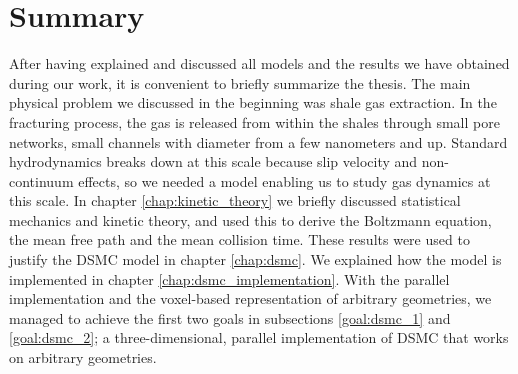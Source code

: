 \section{Summary}
After having explained and discussed all models and the results we have obtained during our work, it is convenient to briefly summarize the thesis. The main physical problem we discussed in the beginning was shale gas extraction. In the fracturing process, the gas is released from within the shales through small pore networks, small channels with diameter from a few nanometers and up. Standard hydrodynamics breaks down at this scale because slip velocity and non-continuum effects, so we needed a model enabling us to study gas dynamics at this scale. In chapter \ref{chap:kinetic_theory} we briefly discussed statistical mechanics and kinetic theory, and used this to derive the Boltzmann equation, the mean free path and the mean collision time. These results were used to justify the DSMC model in chapter \ref{chap:dsmc}. We explained how the model is implemented in chapter \ref{chap:dsmc_implementation}. With the parallel implementation and the voxel-based representation of arbitrary geometries, we managed to achieve the first two goals in subsections \ref{goal:dsmc_1} and \ref{goal:dsmc_2}; a three-dimensional, parallel implementation of DSMC that works on arbitrary geometries. 

